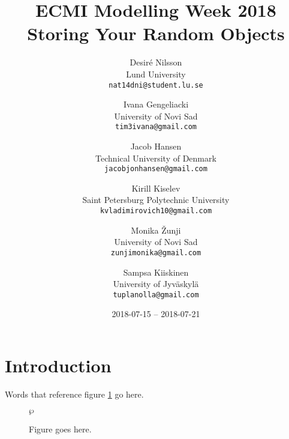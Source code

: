 \documentclass[draft, 12pt]{article}
\title{ECMI Modelling Week 2018 \\ Storing Your Random Objects}
\author{%
Desiré Nilsson \\ Lund University \\ \texttt{nat14dni@student.lu.se} \and
Ivana Gengeliacki \\ University of Novi Sad \\ \texttt{tim3ivana@gmail.com} \and
Jacob Hansen \\ Technical University of Denmark \\ \texttt{jacobjonhansen@gmail.com} \and
Kirill Kiselev \\ Saint Petersburg Polytechnic University \\ \texttt{kvladimirovich10@gmail.com} \and
Monika Žunji \\ University of Novi Sad \\ \texttt{zunjimonika@gmail.com} \and
Sampsa Kiiskinen \\ University of Jyväskylä \\ \texttt{tuplanolla@gmail.com}}
\date{2018-07-15 -- 2018-07-21}
\begin{document}
\maketitle

\section{Introduction}

Words that reference figure \ref{f/stuff} go here.

\begin{figure}
  \centering
  $\wp$ %
  \caption{Figure goes here.}
  \label{f/stuff}
\end{figure}
\end{document}
